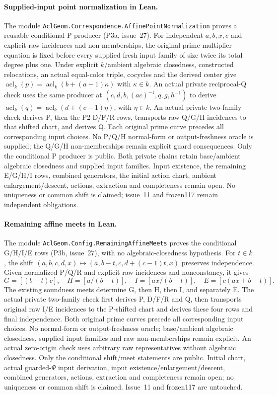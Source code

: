 \documentclass[11pt,oneside]{article}
\theoremstyle{definition}
\theoremstyle{remark}
\newcommand{\acl}{\operatorname{acl}}
\newcommand{\lean}[1]{\nolinkurl{#1}}
\begin{document}
\paragraph{Supplied-input point normalization in Lean.}
The module \lean{AclGeom.Correspondence.AffinePointNormalization}
proves a reusable conditional P producer (P3a, issue~27).
For independent $a,b,x,c$ and explicit raw incidences and non-memberships,
the original prime multiplier equation is fixed before every supplied
fresh input family of size twice its total degree plus one.
Under explicit $k$/ambient algebraic closedness, constructed relocations,
an actual equal-color triple, cocycles and the derived center give
$\acl_k(p)=\acl_k(b+(a-1)\kappa)$ with $\kappa\in k$.
An actual private reciprocal-Q check uses the same producer at
$(c,d,b,(ac)^{-1},q,g,h^{-1})$ to derive
$\acl_k(q)=\acl_k(d+(c-1)\eta)$, with $\eta\in k$.
An actual private two-family check derives P, then the P2 D/F/R rows,
transports raw Q/G/H incidences to that shifted chart, and derives Q.
Each original prime curve precedes all corresponding input choices.
No P/Q/H normal-form or output-freshness oracle is supplied;
the Q/G/H non-memberships remain explicit guard consequences.
Only the conditional P producer is public. Both private chains retain
base/ambient algebraic closedness and supplied input families.
Input existence, the remaining E/G/H/I rows, combined generators,
the initial action chart, ambient enlargement/descent, actions,
extraction and completeness remain open. No uniqueness or common shift
is claimed; issue~11 and frozen117 remain independent obligations.

\clearpage
\paragraph{Remaining affine meets in Lean.}
The module \lean{AclGeom.Config.RemainingAffineMeets} proves the
conditional G/H/I/E rows (P3b, issue~27), with no algebraic-closedness
hypothesis. For $t\in k$, the shift
$(a,b,c,d,x)\mapsto(a,b-t,c,d+(c-1)t,x)$ preserves independence.
Given normalized P/Q/R and explicit raw incidences and nonconstancy, it gives
\[
 G=[(b-t)c],\quad H=[a/(b-t)],\quad
 I=[ax/(b-t)],\quad E=[c(ax+b-t)].
\]
The existing soundness meets determine G, then H, then I, and separately E.
The actual private two-family check first derives P, D/F/R and Q, then
transports original raw I/E incidences to the P-shifted chart and derives
these four rows and final independence. Both original prime curves precede
all corresponding input choices. No normal-form or output-freshness oracle;
base/ambient algebraic closedness, supplied input families and raw
non-memberships remain explicit. An actual zero-origin check uses arbitrary
raw representatives without algebraic closedness.
Only the conditional shift/meet statements are public. Initial chart,
actual guarded-$\Psi$ input derivation, input existence/enlargement/descent,
combined generators, actions, extraction and completeness remain open;
no uniqueness or common shift is claimed. Issue~11 and frozen117 are untouched.
\end{document}
